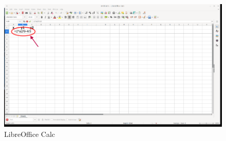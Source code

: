 \begin{figure}[h!]		
	\centering
   	\includegraphics[width=8.0in]{pictures/picture_005.png}
  	\caption{LibreOffice Calc}
   	\label{fig:LibreOfficeCalc005}
\end{figure}
